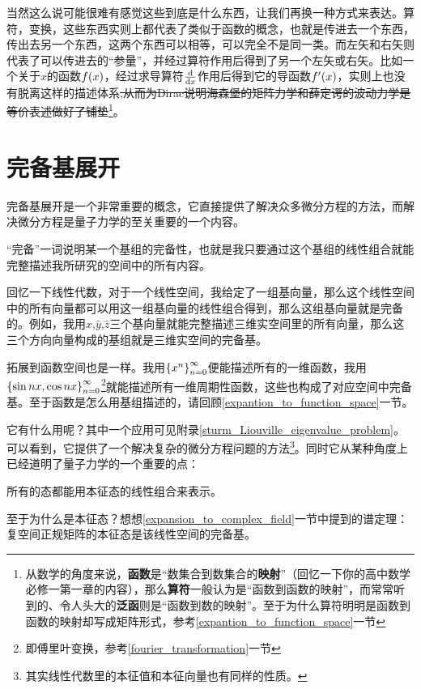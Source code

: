 \documentclass[12pt,a4paper,openany,twoside]{book}
\numberwithin{equation}{section}
\begin{document}
        当然这么说可能很难有感觉这些到底是什么东西，让我们再换一种方式来表达。算符，变换，这些东西实则上都代表了类似于函数的概念，也就是传进去一个东西，传出去另一个东西，这两个东西可以相等，可以完全不是同一类。而左矢和右矢则代表了可以传进去的“参量”，并经过算符作用后得到了另一个左矢或右矢。比如一个关于$x$的函数$f\qty(x)$，经过求导算符$\dv{x}$作用后得到它的导函数$f'\qty(x)$，实则上也没有脱离这样的描述体系\sout{,从而为Dirac说明海森堡的矩阵力学和薛定谔的波动力学是等价表述做好了铺垫}\footnote{从数学的角度来说，\textbf{函数}是“数集合到数集合的\textbf{映射}”（回忆一下你的高中数学必修一第一章的内容），那么\textbf{算符}一般认为是“函数到函数的映射”，而常常听到的、令人头大的\textbf{泛函}则是“函数到数的映射”。至于为什么算符明明是函数到函数的映射却写成矩阵形式，参考\ref{expantion_to_function_space}一节}。

      \section{完备基展开}
        \label{expansion_of_complete_basis}
        完备基展开是一个非常重要的概念，它直接提供了解决众多微分方程的方法，而解决微分方程是量子力学的至关重要的一个内容。

        “完备”一词说明某一个基组的完备性，也就是我只要通过这个基组的线性组合就能完整描述我所研究的空间中的所有内容。
        
        回忆一下线性代数，对于一个线性空间，我给定了一组基向量，那么这个线性空间中的所有向量都可以用这一组基向量的线性组合得到，那么这组基向量就是完备的。例如，我用$\hat{x}$,$\hat{y}$,$\hat{z}$三个基向量就能完整描述三维实空间里的所有向量，那么这三个方向向量构成的基组就是三维实空间的完备基。
        
        拓展到函数空间也是一样。我用$\qty{x^n}_{n=0}^\infty$便能描述所有的一维函数，我用$\qty{\sin{nx},\cos{nx}}_{n=0}^\infty$\footnote{即傅里叶变换，参考\ref{fourier_transformation}一节}就能描述所有一维周期性函数，这些也构成了对应空间中完备基。至于函数是怎么用基组描述的，请回顾\ref{expantion_to_function_space}一节。

        它有什么用呢？其中一个应用可见附录\ref{sturm_Liouville_eigenvalue_problem}。可以看到，它提供了一个解决复杂的微分方程问题的方法\footnote{其实线性代数里的本征值和本征向量也有同样的性质。}。同时它从某种角度上已经道明了量子力学的一个重要的点：
        \begin{center}
          所有的态都能用本征态的线性组合来表示。
        \end{center}
        至于为什么是本征态？想想\ref{expansion_to_complex_field}一节中提到的谱定理：复空间正规矩阵的本征态是该线性空间的完备基。
\end{document}
